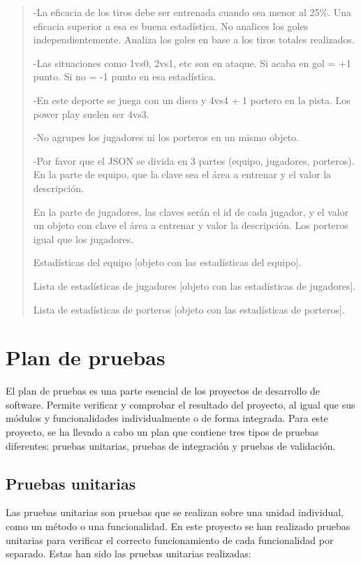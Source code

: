 \begin{quotation}
  -La eficacia de los tiros debe ser entrenada cuando sea menor al 25\%. Una eficacia superior a esa es buena estadística. No analices los goles independientemente. Analiza los goles en base a los tiros totales realizados.

  -Las situaciones como 1vs0, 2vs1, etc son en ataque. Si acaba en gol = +1 punto. Si no = -1 punto en esa estadística.

  -En este deporte se juega con un disco y 4vs4 + 1 portero en la pista. Los power play suelen ser 4vs3.

  -No agrupes los jugadores ni los porteros en un mismo objeto.

  -Por favor que el JSON se divida en 3 partes (equipo, jugadores, porteros). En la parte de equipo, que la clave sea el área a entrenar y el valor la descripción.

  En la parte de jugadores, las claves serán el id de cada jugador, y el valor un objeto con clave el área a entrenar y valor la descripción. Los porteros igual que los jugadores.

  Estadísticas del equipo [objeto con las estadísticas del equipo].

  Lista de estadísticas de jugadores [objeto con las estadísticas de jugadores].

  Lista de estadísticas de porteros [objeto con las estadísticas de porteros].\guillemotright
\end{quotation}

\section{Plan de pruebas}

El plan de pruebas es una parte esencial de los proyectos de desarrollo de software. Permite verificar y comprobar el resultado del proyecto, al igual que sus módulos y funcionalidades individualmente o de forma integrada. Para este proyecto, se ha llevado a cabo un plan que contiene tres tipos de pruebas diferentes: pruebas unitarias, pruebas de integración y pruebas de validación.

\subsection{Pruebas unitarias}

Las pruebas unitarias son pruebas que se realizan sobre una unidad individual, como un método o una funcionalidad. En este proyecto se han realizado pruebas unitarias para verificar el correcto funcionamiento de cada funcionalidad por separado. Estas han sido las pruebas unitarias realizadas:


